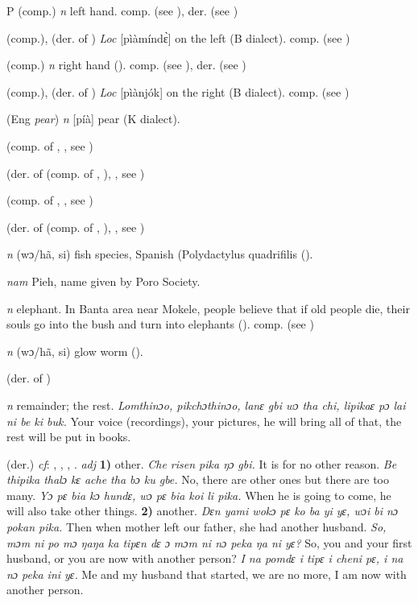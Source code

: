 \begin{letter}{P}
 (comp.) \textit{n} left hand. comp.  (see ), der.  (see )

 (comp.), (der. of ) \textit{Loc} [pìàmíndɛ̀] on the left (B dialect). comp.  (see )

 (comp.) \textit{n} right hand (\citealt{Pichl1967}). comp.  (see ), der.  (see )

 (comp.), (der. of ) \textit{Loc} [pìànjók] on the right (B dialect). comp.  (see )

 (Eng \textit{pear}) \textit{n} [píà] pear (K dialect). 

 (comp. of , , see )

 (der. of  (comp. of , ), , see ) 

 (comp. of , , see ) 

 (der. of  (comp. of , ), , see ) 

 \textit{n} (wɔ/hã, si) fish species, Spanish (Polydactylus quadrifilis (\citealt{Pichl1967}).

 \textit{nam} Pieh, name given by Poro Society.

 \textit{n} elephant. In Banta area near Mokele, people believe that if old people die, their souls go into the bush and turn into elephants (\citealt{Pichl1967}). comp.  (see ) 

 \textit{n} (wɔ/hã, si) glow worm (\citealt{Pichl1967}).

 (der. of ) 

 \textit{n} remainder; the rest. \textit{Lomthinɔo, pikchɔthinɔo, lanɛ gbi wɔ tha chi, lipikaɛ pɔ lai ni be ki buk.} Your voice (recordings), your pictures, he will bring all of that, the rest will be put in books.

 (der.) \textit{cf}: , , , . \textit{adj} \textbf{1)} other. \textit{Che risen pika ŋɔ gbi.} It is for no other reason. \textit{Be thipika thalɔ kɛ ache tha bɔ ku gbe.} No, there are other ones but there are too many. \textit{Yɔ pɛ bia kɔ hundɛ, wɔ pɛ bia koi li pika.} When he is going to come, he will also take other things. \textbf{2)} another. \textit{Dɛn yami wokɔ pɛ ko ba yi yɛ, wɔi bi nɔ pokan pika.} Then when mother left our father, she had another husband. \textit{So, mɔm ni po mɔ ŋaŋa ka tipɛn dɛ ɔ mɔm ni nɔ peka ŋa ni yɛ?} So, you and your first husband, or you are now with another person? \textit{I na pomdɛ i tipɛ i cheni pɛ, i na nɔ peka ini yɛ.} Me and my husband that started, we are no more, I am now with another person.


\end{letter}

